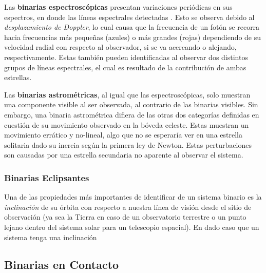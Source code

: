 Las \textbf{binarias espectroscópicas} presentan variaciones periódicas en sus
espectros, en donde las líneas espectrales detectadas 
. Esto se observa
debido al \textit{desplazamiento de Doppler}, lo cual causa que la frecuencia de
un fotón se recorra hacia frecuencias más pequeñas (azules) o más grandes
(rojas) dependiendo de su velocidad radial con respecto al observador, si se va
acercando o alejando, respectivamente. Estas también pueden identificadas al
observar dos distintos grupos de líneas espectrales, el cual es resultado de la
contribución de ambas estrellas.

Las \textbf{binarias astrométricas}, al igual que las espectroscópicas, solo
muestran una componente visible al ser observada, al contrario de las binarias
visibles. Sin embargo, una binaria astrométrica difiera de las otras dos
categorías definidas en cuestión de su movimiento observado en la bóveda
celeste. Estas muestran un movimiento errático y no-lineal, algo que no se
esperaría ver en una estrella solitaria dado su inercia según la primera ley de
Newton. Estas perturbaciones son causadas por una estrella secundaria no
aparente al observar el sistema. 

\subsubsection{Binarias Eclipsantes}

Una de las propiedades más importantes de identificar de un sistema binario es la \textit{inclinación} de su órbita con respecto a nuestra línea de visión desde el sitio de observación (ya sea la Tierra en caso de un observatorio terrestre o un punto lejano dentro del sistema solar para un telescopio espacial). En dado caso que un sistema tenga una inclinación 

\subsection{Binarias en Contacto}